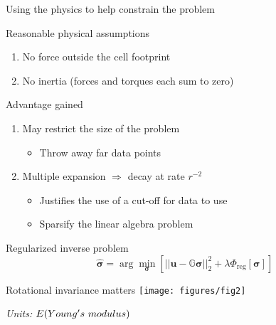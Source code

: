 \documentclass[presentation]{beamer}
\newcommand{\bsigma}{\boldsymbol\sigma}
\begin{document}
\begin{frame}{Using the physics to help constrain the problem}
\begin{block}{Reasonable physical assumptions}
\begin{enumerate}
\item No force outside the cell footprint
\item No inertia (forces and torques each sum to zero)
\end{enumerate}
\end{block}

 
\begin{exampleblock}{Advantage gained}
\begin{enumerate}
\item May restrict the size of the problem
\begin{itemize}
\item Throw away far data points
\end{itemize}
\item Multiple expansion $\Rightarrow$  decay at rate $r^{-2}$
\begin{itemize}
\item Justifies the use of a cut-off for data to use
\item Sparsify the linear algebra problem
\end{itemize}
\end{enumerate}
\end{exampleblock}
\begin{block}{Regularized inverse problem}
\[
\hat{\boldsymbol\sigma} = \arg\min_{\boldsymbol\sigma}\left[ ||\mathbf{u} - \mathbb{G}\mathbf{\bsigma}  ||_2^2 + \lambda\Phi_{\textrm{reg}}[\boldsymbol\sigma] \right]
\]
\end{block}
\end{frame}

 
\begin{frame}{Rotational invariance matters}
\centering
\texttt{[image: figures/fig2]}

\smallskip
\emph{Units:} $E\textrm(Young's\ modulus)$
\end{frame}
\end{document}
